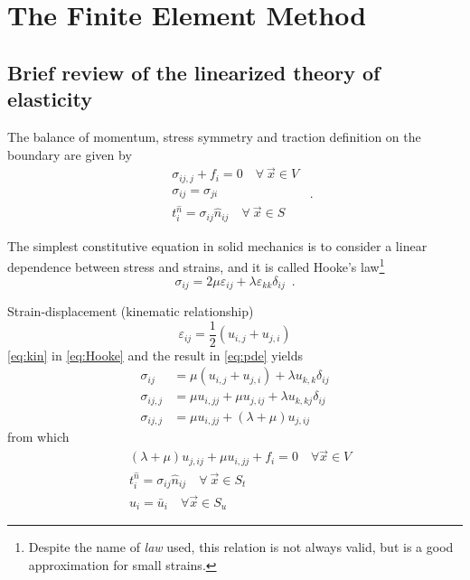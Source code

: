 \chapter{The Finite Element Method}

\section{Brief review of the linearized theory of elasticity}
The balance of momentum, stress symmetry and traction definition on the boundary are given by
\begin{equation} \label{eq:pde}
\begin{split}
&{\sigma _{ij,j}} + {f_i} = 0 \quad \forall\ \vec{x} \in V\\
 &\sigma _{ij}=\sigma _{ji}\\
& t_i^{\hat n} = {\sigma _{ij}}{\hat n_{ij}} \quad \forall\ \vec{x} \in S
\end{split} \enspace .
\end{equation}

The simplest constitutive equation in solid mechanics is to consider a linear dependence between stress and strains, and it is called Hooke's law\footnote{Despite the name of \emph{law} used, this relation is not always valid, but is a good approximation for small strains.}
\begin{equation} \label{eq:Hooke}
{\sigma _{ij}} = 2\mu {\varepsilon _{ij}} + \lambda {\varepsilon _{kk}}{\delta _{ij}} \enspace .
\end{equation}

Strain-displacement (kinematic relationship)
\begin{equation}\label{eq:kin}
{\varepsilon _{ij}} = \frac{1}{2}\left( u_{i,j} + u_{j,i}\right)
\end{equation}
\cref{eq:kin} in \cref{eq:Hooke} and the result in \cref{eq:pde} yields
\begin{align*}
\sigma _{ij} &= \mu \left( u_{i,j} + u_{j,i}\right) + \lambda u_{k,k}\delta _{ij}\\
\sigma_{ij,j} &= \mu u_{i,jj} + \mu u_{j,ij} + \lambda u_{k,kj}\delta_{ij}\\
\sigma_{ij,j} &= \mu u_{i,jj} + \left(\lambda  + \mu\right) u_{j,ij}
\end{align*}
from which
\begin{equation} \label{eq:navier}
\begin{split}
&\left(\lambda  + \mu \right)u_{j,ij} + \mu u_{i,jj} + {f_i} = 0 \quad \forall \vec{x} \in V \\
&t_i^{\hat n} = \sigma _{ij} \hat n_{ij} \quad \forall\ \vec{x} \in S_t\\
& {u_i} = \bar{u}_i \quad \forall \vec x \in S_u
\end{split}
\end{equation}


